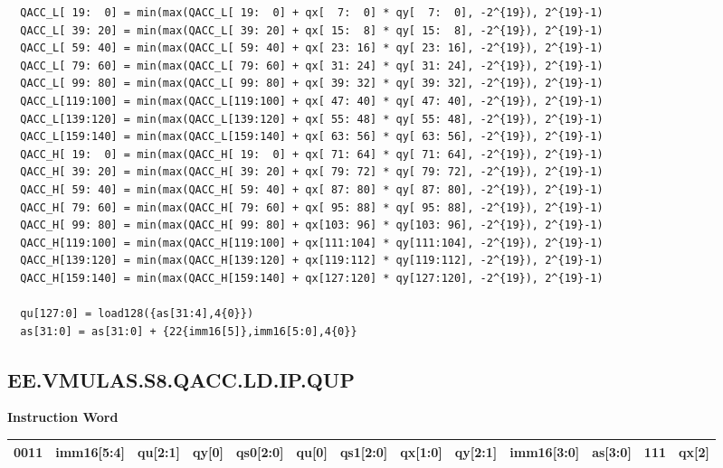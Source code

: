 \begin{lstlisting}
  QACC_L[ 19:  0] = min(max(QACC_L[ 19:  0] + qx[  7:  0] * qy[  7:  0], -2^{19}), 2^{19}-1)
  QACC_L[ 39: 20] = min(max(QACC_L[ 39: 20] + qx[ 15:  8] * qy[ 15:  8], -2^{19}), 2^{19}-1)
  QACC_L[ 59: 40] = min(max(QACC_L[ 59: 40] + qx[ 23: 16] * qy[ 23: 16], -2^{19}), 2^{19}-1)
  QACC_L[ 79: 60] = min(max(QACC_L[ 79: 60] + qx[ 31: 24] * qy[ 31: 24], -2^{19}), 2^{19}-1)
  QACC_L[ 99: 80] = min(max(QACC_L[ 99: 80] + qx[ 39: 32] * qy[ 39: 32], -2^{19}), 2^{19}-1)
  QACC_L[119:100] = min(max(QACC_L[119:100] + qx[ 47: 40] * qy[ 47: 40], -2^{19}), 2^{19}-1)
  QACC_L[139:120] = min(max(QACC_L[139:120] + qx[ 55: 48] * qy[ 55: 48], -2^{19}), 2^{19}-1)
  QACC_L[159:140] = min(max(QACC_L[159:140] + qx[ 63: 56] * qy[ 63: 56], -2^{19}), 2^{19}-1)
  QACC_H[ 19:  0] = min(max(QACC_H[ 19:  0] + qx[ 71: 64] * qy[ 71: 64], -2^{19}), 2^{19}-1)
  QACC_H[ 39: 20] = min(max(QACC_H[ 39: 20] + qx[ 79: 72] * qy[ 79: 72], -2^{19}), 2^{19}-1)
  QACC_H[ 59: 40] = min(max(QACC_H[ 59: 40] + qx[ 87: 80] * qy[ 87: 80], -2^{19}), 2^{19}-1)
  QACC_H[ 79: 60] = min(max(QACC_H[ 79: 60] + qx[ 95: 88] * qy[ 95: 88], -2^{19}), 2^{19}-1)
  QACC_H[ 99: 80] = min(max(QACC_H[ 99: 80] + qx[103: 96] * qy[103: 96], -2^{19}), 2^{19}-1)
  QACC_H[119:100] = min(max(QACC_H[119:100] + qx[111:104] * qy[111:104], -2^{19}), 2^{19}-1)
  QACC_H[139:120] = min(max(QACC_H[139:120] + qx[119:112] * qy[119:112], -2^{19}), 2^{19}-1)
  QACC_H[159:140] = min(max(QACC_H[159:140] + qx[127:120] * qy[127:120], -2^{19}), 2^{19}-1)

  qu[127:0] = load128({as[31:4],4{0}})
  as[31:0] = as[31:0] + {22{imm16[5]},imm16[5:0],4{0}}
\end{lstlisting}

\clearpage
\subsection{EE.VMULAS.S8.QACC.LD.IP.QUP}\label{instruction:EEVMULASS8QACCLDIPQUP}
\setlength\tabcolsep{5pt}
\textbf{Instruction Word} \\
\begin{tabular}{|c|c|c|c|c|c|c|c|c|c|c|c|c|}
	\hline
	0011 & imm16[5:4] & qu[2:1] & qy[0] & qs0[2:0] & qu[0] & qs1[2:0] & qx[1:0] & qy[2:1] & imm16[3:0] & as[3:0] & 111 & qx[2] \\
	\hline
\end{tabular}

